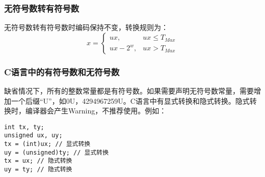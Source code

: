 \subsubsection{无符号数转有符号数}
无符号数转有符号数时编码保持不变，转换规则为：
\[x=\begin{cases}ux, & ux\leq T_{Max}\\ux - 2^{w}, & ux>T_{Max}\end{cases}\]
\subsubsection{C语言中的有符号数和无符号数}
缺省情况下，所有的整数常量都是有符号数。如果需要声明无符号数常量，需要增加一个后缀“U”，如0U，4294967259U。C语言中有显式转换和隐式转换。隐式转换时，编译器会产生Warning，不推荐使用。例如：
\begin{verbatim}
int tx, ty;
unsigned ux, uy;
tx = (int)ux; // 显式转换
uy = (unsigned)ty; // 显式转换
tx = ux; // 隐式转换
uy = ty; // 隐式转换
\end{verbatim}
